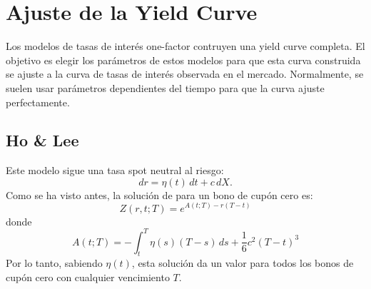 \section{Ajuste de la Yield Curve}\label{sec:ajuste_yield_curve}
Los modelos de tasas de interés one-factor contruyen una yield curve completa. El objetivo es elegir los parámetros de estos modelos para que esta curva construida se ajuste a la curva de tasas de interés observada en el mercado. Normalmente, se suelen usar parámetros dependientes del tiempo para que la curva ajuste perfectamente.


\subsection{Ho \& Lee}
Este modelo sigue una tasa spot neutral al riesgo:
\begin{equation}
    dr = \eta(t)\,dt + c\,dX.
\end{equation}
Como se ha visto antes, la solución de para un bono de cupón cero es:
\begin{equation}
    Z(r, t; T) = e^{A(t;T) - r(T-t)}
\end{equation}
donde
\begin{equation}
    A(t; T) = -\int_t^T \eta(s)(T-s)\,ds + \frac{1}{6}c^2(T-t)^3
\end{equation}
Por lo tanto, sabiendo $\eta(t)$, esta solución da un valor para todos los bonos de cupón cero con cualquier vencimiento $T$.


